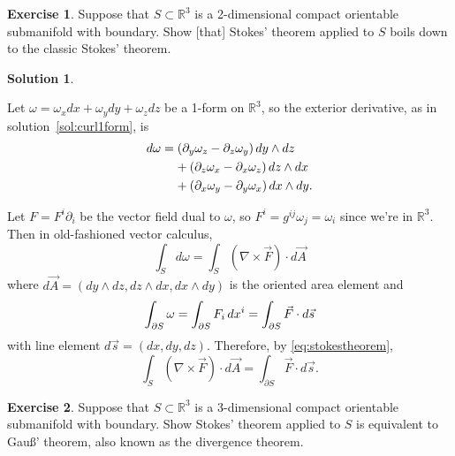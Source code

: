 \documentclass[11pt, a4paper]{report}
\theoremstyle{definition}
\newtheorem{exercise}{Exercise}[part]
\newtheorem{solution}{Solution}[part]
\newenvironment{ex}{\begin{exercise}}{\end{exercise}\pagebreak[1]}
\newenvironment{sol}{\begin{solution}}{\end{solution}\pagebreak[3]}
\newcommand*{\pheq}{\ensuremath\mathrel{\phantom{=}}\negmedspace{}}
\newcommand*{\op}[1]{\ensuremath\mathop{}\mathopen{}#1}
\renewcommand*{\d}{\op{d}}
\renewcommand*{\star}{\op{\binstar}\mathord{}}
\begin{document}
\begin{ex}

Suppose that $S \subset \mathbb{R}^3$ is a 2-dimensional compact orientable submanifold with boundary.
Show [that] Stokes' theorem applied to $S$ boils down to the classic Stokes' theorem.

\end{ex}

\begin{sol}\label{sol:classicstokestheorem}

Let $\omega = \omega_x dx + \omega_y dy + \omega_z dz$ be a 1-form on $\mathbb{R}^3$, so the exterior derivative, as in solution~\ref{sol:curl1form}, is
\begin{align*}
    d\omega &= (\partial_y \omega_z - \partial_z \omega_y) \d y \wedge dz \\
        &\pheq + (\partial_z \omega_x - \partial_x \omega_z) \d z \wedge dx \\
        &\pheq + (\partial_x \omega_y - \partial_y \omega_x) \d x \wedge dy.
\end{align*}


Let $F = F^i \partial_i$ be the vector field dual to $\omega$, so $F^i = g^{ij} \omega_j = \omega_i$ since we're in $\mathbb{R}^3$. Then in old-fashioned vector calculus,
\[
    \int_S d\omega = \int_S (\nabla \times \vec{F}) \cdot d\vec{A}
\]
where $d\vec{A} = (dy \wedge dz, dz \wedge dx, dx \wedge dy)$ is the oriented area element
and
\[
    \int_{\partial S} \omega = \int_{\partial S} F_i \d x^i
                             = \int_{\partial S} \vec{F} \cdot d\vec{s}
\]
with line element $d\vec{s} = (dx, dy, dz)$.
Therefore, by \ref{eq:stokestheorem}, %
\[
    \int_S (\nabla \times \vec{F}) \cdot d\vec{A} = \int_{\partial S} \vec{F} \cdot d\vec{s}.
\]

\end{sol}

\begin{ex}

Suppose that $S \subset \mathbb{R}^3$ is a 3-dimensional compact orientable submanifold with boundary.
Show Stokes' theorem applied to $S$ is equivalent to Gau\ss' theorem, also known as the divergence theorem.

\end{ex}
\end{document}
